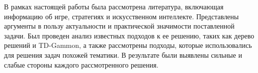 В рамках настоящей работы была рассмотрена литература, включающая информацию об игре, стратегиях и искусственном интеллекте. Представлены аргументы в пользу актуальности и практической значимости поставленной задачи. Был проведен анализ известных подходов к ее решению, таких как дерево решений и TD-Gammon, а также рассмотрены подходы, которые использовались для решения задач похожей тематики. В результате были выявлены сильные и слабые стороны каждого рассмотренного решения.
